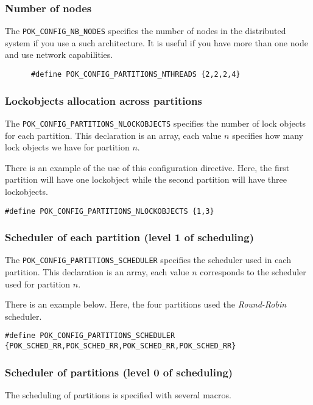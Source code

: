       \subsubsection{Number of nodes}
      The \texttt{POK\_CONFIG\_NB\_NODES} specifies the number of nodes in the
      distributed system if you use a such architecture. It is useful if you
      have more than one node and use network capabilities.

\begin{verbatim}
      #define POK_CONFIG_PARTITIONS_NTHREADS {2,2,2,4}
\end{verbatim}


      \subsubsection{Lockobjects allocation across partitions}
      The \texttt{POK\_CONFIG\_PARTITIONS\_NLOCKOBJECTS} specifies the number of
      lock objects for each partition. This declaration is an array, each value
      $n$ specifies how many lock objects we have for partition $n$.

      There is an example of the use of this configuration directive. Here, the
      first partition will have one lockobject while the second partition will
      have three lockobjects.

\begin{verbatim}
#define POK_CONFIG_PARTITIONS_NLOCKOBJECTS {1,3}
\end{verbatim}


      \subsubsection{Scheduler of each partition (level 1 of scheduling)}
      The \texttt{POK\_CONFIG\_PARTITIONS\_SCHEDULER} specifies the scheduler
      used in each partition. This declaration is an array, each value $n$
      corresponds to the scheduler used for partition $n$.

      There is an example below. Here, the four partitions used the
      \textit{Round-Robin} scheduler.

\begin{verbatim}
#define POK_CONFIG_PARTITIONS_SCHEDULER {POK_SCHED_RR,POK_SCHED_RR,POK_SCHED_RR,POK_SCHED_RR}
\end{verbatim}


      \subsubsection{Scheduler of partitions (level 0 of scheduling)}
      The scheduling of partitions is specified with several macros.

